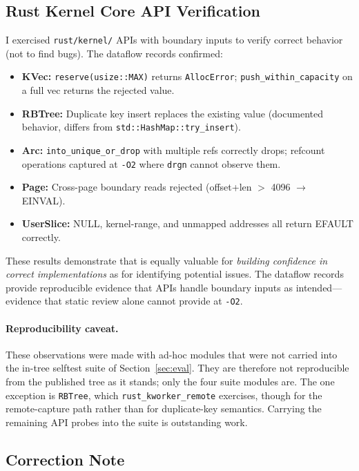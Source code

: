 \documentclass{article}
\begin{document}
\subsection{Rust Kernel Core API Verification}

I exercised \texttt{rust/kernel/} APIs with boundary inputs to verify
correct behavior (not to find bugs). The dataflow records confirmed:

\begin{itemize}[nosep]
  \item \textbf{KVec:} \texttt{reserve(usize::MAX)} returns
        \texttt{AllocError}; \texttt{push\_within\_capacity}
        on a full vec returns the rejected value.
  \item \textbf{RBTree:} Duplicate key insert replaces the existing value
        (documented behavior, differs from \texttt{std::HashMap::try\_insert}).
  \item \textbf{Arc:} \texttt{into\_unique\_or\_drop} with multiple refs
        correctly drops; refcount operations captured at \texttt{-O2}
        where \texttt{drgn} cannot observe them.
  \item \textbf{Page:} Cross-page boundary reads rejected
        (offset+len $>$ 4096 $\to$ EINVAL).
  \item \textbf{UserSlice:} NULL, kernel-range, and unmapped addresses all
        return EFAULT correctly.
\end{itemize}

\noindent These results demonstrate that \toolname{} is equally valuable for
\emph{building confidence in correct implementations} as for identifying
potential issues. The dataflow records provide reproducible evidence that
APIs handle boundary inputs as intended---evidence that static review alone
cannot provide at \texttt{-O2}.

\paragraph{Reproducibility caveat.} These observations were made with ad-hoc
modules that were not carried into the in-tree selftest suite of
Section~\ref{sec:eval}. They are therefore not reproducible from the published
tree as it stands; only the four suite modules are. The one exception is
\texttt{RBTree}, which \texttt{rust\_kworker\_remote} exercises, though for the
remote-capture path rather than for duplicate-key semantics. Carrying the
remaining API probes into the suite is outstanding work.

\subsection{Correction Note}
\end{document}
